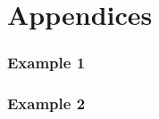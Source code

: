 \newpage
\appendix
\renewcommand{\thesection}{\Alph{section}}
\renewcommand{\thesubsection}{\roman{subsection}}
\renewcommand{\theequation}{A-\arabic{equation}}

\part*{Appendices}


\section{Example 1}

\section{Example 2}